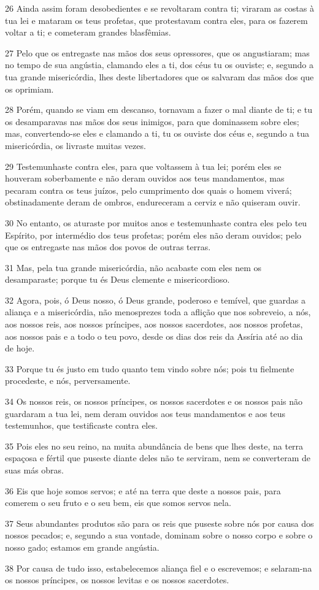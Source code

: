 \par 26 Ainda assim foram desobedientes e se revoltaram contra ti; viraram as costas à tua lei e mataram os teus profetas, que protestavam contra eles, para os fazerem voltar a ti; e cometeram grandes blasfêmias.
\par 27 Pelo que os entregaste nas mãos dos seus opressores, que os angustiaram; mas no tempo de sua angústia, clamando eles a ti, dos céus tu os ouviste; e, segundo a tua grande misericórdia, lhes deste libertadores que os salvaram das mãos dos que os oprimiam.
\par 28 Porém, quando se viam em descanso, tornavam a fazer o mal diante de ti; e tu os desamparavas nas mãos dos seus inimigos, para que dominassem sobre eles; mas, convertendo-se eles e clamando a ti, tu os ouviste dos céus e, segundo a tua misericórdia, os livraste muitas vezes.
\par 29 Testemunhaste contra eles, para que voltassem à tua lei; porém eles se houveram soberbamente e não deram ouvidos aos teus mandamentos, mas pecaram contra os teus juízos, pelo cumprimento dos quais o homem viverá; obstinadamente deram de ombros, endureceram a cerviz e não quiseram ouvir.
\par 30 No entanto, os aturaste por muitos anos e testemunhaste contra eles pelo teu Espírito, por intermédio dos teus profetas; porém eles não deram ouvidos; pelo que os entregaste nas mãos dos povos de outras terras.
\par 31 Mas, pela tua grande misericórdia, não acabaste com eles nem os desamparaste; porque tu és Deus clemente e misericordioso.
\par 32 Agora, pois, ó Deus nosso, ó Deus grande, poderoso e temível, que guardas a aliança e a misericórdia, não menosprezes toda a aflição que nos sobreveio, a nós, aos nossos reis, aos nossos príncipes, aos nossos sacerdotes, aos nossos profetas, aos nossos pais e a todo o teu povo, desde os dias dos reis da Assíria até ao dia de hoje.
\par 33 Porque tu és justo em tudo quanto tem vindo sobre nós; pois tu fielmente procedeste, e nós, perversamente.
\par 34 Os nossos reis, os nossos príncipes, os nossos sacerdotes e os nossos pais não guardaram a tua lei, nem deram ouvidos aos teus mandamentos e aos teus testemunhos, que testificaste contra eles.
\par 35 Pois eles no seu reino, na muita abundância de bens que lhes deste, na terra espaçosa e fértil que puseste diante deles não te serviram, nem se converteram de suas más obras.
\par 36 Eis que hoje somos servos; e até na terra que deste a nossos pais, para comerem o seu fruto e o seu bem, eis que somos servos nela.
\par 37 Seus abundantes produtos são para os reis que puseste sobre nós por causa dos nossos pecados; e, segundo a sua vontade, dominam sobre o nosso corpo e sobre o nosso gado; estamos em grande angústia.
\par 38 Por causa de tudo isso, estabelecemos aliança fiel e o escrevemos; e selaram-na os nossos príncipes, os nossos levitas e os nossos sacerdotes.

